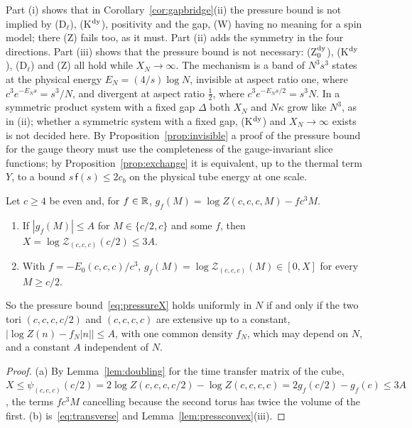Part (i) shows that in Corollary~\ref{cor:gapbridge}(ii) the pressure bound is
not implied by (D$_\ell$), (K$^{\rm dy}$), positivity and the gap, (W) having no
meaning for a spin model; there (Z) fails too, as it must. Part (ii) adds the
symmetry in the four directions. Part (iii) shows that the pressure bound is
not necessary: (Z$_0^{\rm dy}$), (K$^{\rm dy}$), (D$_\ell$) and (Z) all hold
while $X_N\to\infty$. The mechanism is a band of $N^3s^3$ states at the
physical energy $E_N=(4/s)\log N$, invisible at aspect ratio one, where
$c^3e^{-E_Ns}=s^3/N$, and divergent at aspect ratio $\frac12$, where $c^3e^{-E_N
s/2}=s^3N$. In a symmetric product system with a fixed gap $\Delta$ both $X_N$
and $N\kappa$ grow like $N^3$, as in (ii); whether a symmetric system with a
fixed gap, (K$^{\rm dy}$) and $X_N\to\infty$ exists is not decided here. By
Proposition~\ref{prop:invisible} a proof of the pressure bound for the gauge
theory must use the completeness of the gauge-invariant slice functions; by
Proposition~\ref{prop:exchange} it is equivalent, up to the thermal term $Y$,
to a bound $s\,\mathsf f(s)\le2c_b$ on the physical tube energy at one scale.

\begin{proposition}\label{prop:pressequiv}
Let $c\ge4$ be even and, for $f\in\mathbb{R}$, $g_f(M)=\log Z(c,c,c,M)-fc^3M$.
\begin{enumerate}[label=\textup{(\alph*)},leftmargin=*]
\item If $|g_f(M)|\le A$ for $M\in\{c/2,c\}$ and some $f$, then $X=\log
\mathcal Z_{(c,c,c)}(c/2)\le3A$.
\item With $f=-E_0(c,c,c)/c^3$, $g_f(M)=\log\mathcal Z_{(c,c,c)}(M)\in[0,X]$
for every $M\ge c/2$.
\end{enumerate}
So the pressure bound~\eqref{eq:pressureX} holds uniformly in $N$ if and only
if the two tori $(c,c,c,c/2)$ and $(c,c,c,c)$ are extensive up to a constant,
$|\log Z(n)-f_N|n||\le A$, with one common density $f_N$, which may depend on
$N$, and a constant $A$ independent of $N$.
\end{proposition}

\begin{proof}
(a) By Lemma~\ref{lem:doubling} for the time transfer matrix of the cube,
$X\le\psi_{(c,c,c)}(c/2)=2\log Z(c,c,c,c/2)-\log Z(c,c,c,c)=2g_f(c/2)-g_f(c)
\le3A$, the terms $fc^3M$ cancelling because the second torus has twice the
volume of the first. (b) is~\eqref{eq:transverse} and
Lemma~\ref{lem:pressconvex}(iii).
\end{proof}

